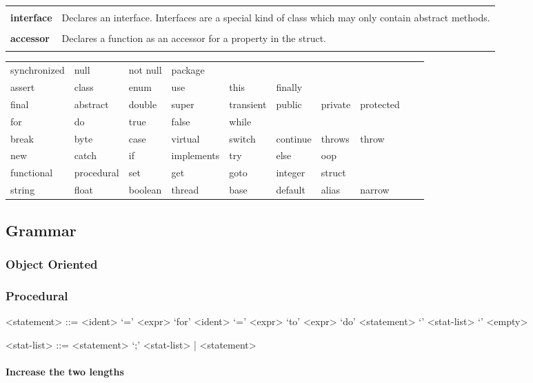 \documentclass[hidelinks]{article}
\begin{document}
\begin{longtable}{ |p{4cm}|p{11cm}|  }
& \\
\textbf{interface} & Declares an interface. Interfaces are a special kind of class which may only contain abstract methods. \\
& \\
\textbf{accessor} & Declares a function as an accessor for a property in the struct.\\
&\\
\hline
\end{longtable}

\begin{tabular}{llllllllll}
synchronized & null & not null & package & \\
assert & class & enum & use & this & finally & \\
final & abstract & double & super & transient & public & private & protected & \\
for & do & true & false & while & \\
break & byte & case & virtual & switch & continue & throws & throw & \\
new & catch & if & implements & try & else & oop & \\
functional & procedural & set & get & goto & integer & struct & \\
string & float & boolean & thread & base & default & alias & narrow \\
\end{tabular}
\subsection{Grammar}
\subsubsection{Object Oriented}
\subsubsection{Procedural}
\begin{grammar}

<statement> ::= <ident> `=' <expr> 
\alt `for' <ident> `=' <expr> `to' <expr> `do' <statement> 
\alt `{' <stat-list> `}' 
\alt <empty> 

<stat-list> ::= <statement> `;' <stat-list> | <statement> 

\end{grammar}
\paragraph{Increase the two lengths}
\setlength{\grammarparsep}{20pt plus 1pt minus 1pt} %
\setlength{\grammarindent}{12em} %
\end{document}
